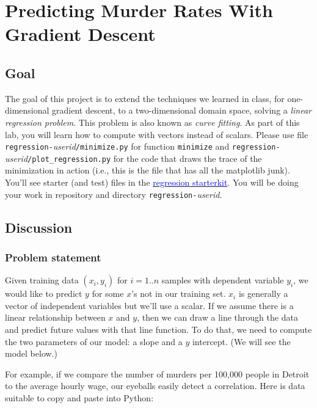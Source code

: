 \documentclass[titlepage]{tufte-book}
\newcounter{problem}
\begin{document}
\chapter{Predicting Murder Rates With Gradient Descent}

\section{Goal}

\begin{fullwidth}

The goal of this project is to extend the techniques we learned in class, for one-dimensional gradient descent, to a two-dimensional domain space, solving a {\em linear regression problem}.  This problem is also known as {\em curve fitting}.  As part of this lab, you will learn how to compute with vectors instead of scalars. Please use file {\tt regression-}{\em userid}{\tt /minimize.py} for function {\tt minimize} and {\tt regression-}{\em userid}{\tt /plot\_regression.py} for the code that draws the trace of the minimization in action (i.e., this is the file that has all the matplotlib junk).  You'll see starter (and test) files in the \href{https://github.com/parrt/msan501-starterkit/tree/master/regression}{\textcolor{blue}{regression starterkit}}. You will be doing your work in repository and directory {\tt regression-}{\em userid}{\tt }.

\section{Discussion}

\subsection{Problem statement}

Given training data $(x_i, y_i)$ for $i=1..n$ samples with dependent variable $y_i$, we would like to predict $y$ for some $x$'s not in our training set. $x_i$ is generally a vector of independent variables but we'll use a scalar. If we assume there is a linear relationship between $x$ and $y$, then we can draw a line through the data and predict future values with that line function. To do that, we need to compute the two parameters of our model: a slope and a $y$ intercept. (We will see the model below.)

For example, if we compare the number of murders per 100,000 people in Detroit to the average hourly wage, our eyeballs easily detect a correlation.  Here is data suitable to copy and paste into Python:


\end{fullwidth}
\end{document}
